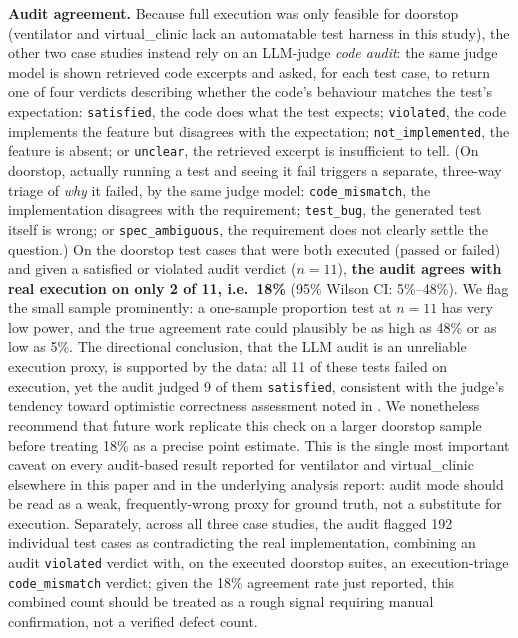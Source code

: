 \documentclass[conference]{IEEEtran}
\begin{document}
  \textbf{Audit agreement.} Because full execution was only feasible for
  doorstop (ventilator and virtual\_clinic lack an automatable test harness in
  this study), the other two case studies instead rely on an LLM-judge
  \emph{code audit}: the same judge model is shown retrieved code excerpts and
  asked, for each test case, to return one of four verdicts describing whether
  the code's behaviour matches the test's expectation: \texttt{satisfied}, the
  code does what the test expects; \texttt{violated}, the code implements the
  feature but disagrees with the expectation; \texttt{not\_implemented}, the
  feature is absent; or \texttt{unclear}, the retrieved excerpt is insufficient
  to tell. (On doorstop, actually running a test and seeing it fail triggers a
  separate, three-way triage of \emph{why} it failed, by the same judge model:
  \texttt{code\_mismatch}, the implementation disagrees with the requirement;
  \texttt{test\_bug}, the generated test itself is wrong; or
  \texttt{spec\_ambiguous}, the requirement does not clearly settle the
  question.) On the doorstop test cases that were both executed (passed or failed) and given a
  satisfied or violated audit verdict ($n=11$), \textbf{the audit agrees with real
  execution on only 2 of 11, i.e.\ 18\%} (95\% Wilson CI: 5\%--48\%). We flag the small sample
  prominently: a one-sample proportion test at $n=11$ has very low power, and
  the true agreement rate could plausibly be as high as 48\% or as low as 5\%.
  The directional conclusion, that the LLM audit is an unreliable execution
  proxy, is supported by the data: all 11 of these tests failed on execution, yet the
  audit judged 9 of them \texttt{satisfied}, consistent with the
  judge's tendency toward optimistic correctness assessment noted in
  \cite{yuan2023chatgpt}. We nonetheless recommend that future work replicate
  this check on a larger doorstop sample before treating 18\% as a precise
  point estimate. This is the single most important caveat on every
  audit-based result reported for ventilator and virtual\_clinic elsewhere in
  this paper and in the underlying analysis report: audit mode should be read
  as a weak, frequently-wrong proxy for ground truth, not a substitute for
  execution. Separately, across all three case studies, the audit flagged 192
  individual test cases as contradicting the real implementation, combining an
  audit \texttt{violated} verdict with, on the executed doorstop suites, an
  execution-triage \texttt{code\_mismatch} verdict; given the 18\% agreement
  rate just reported, this combined count should be treated as a rough signal
  requiring manual confirmation, not a verified defect count.
\end{document}
